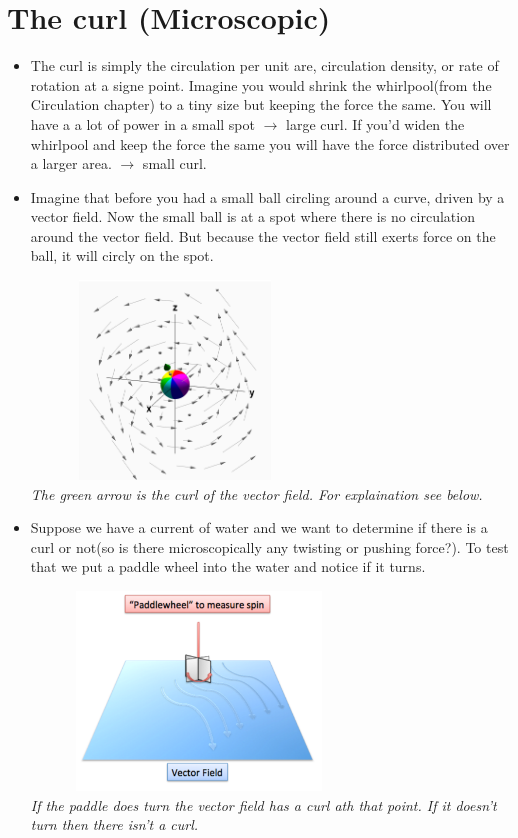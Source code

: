 \documentclass[12pt,a4paper]{article}
\begin{document}
	\section{The curl (Microscopic)}
	\begin{itemize}
		
		\item The curl is simply the circulation per unit are, circulation density, or rate of rotation at a signe point. Imagine you would shrink the whirlpool(from the Circulation chapter) to a tiny size but keeping the force the same. You will have a a lot of power in a small spot $\rightarrow$ large curl. If you'd widen the whirlpool and keep the force the same you will have the force distributed over a larger area. $\rightarrow$ small curl. 
		
		\item Imagine that before you had a small ball circling around a curve, driven by a vector field. Now the small ball is at a spot where there is no circulation around the vector field. But because the vector field still exerts force on the ball, it will circly on the spot. 
		
		\includegraphics[width=0.6\textwidth, height = 200px]{curl.png}\\
		\textit{The green arrow is the curl of the vector field. For explaination see below.}
		
		\item Suppose we have a current of water and we want to determine if there is a curl or not(so is there microscopically any twisting or pushing force?). To test that we put a paddle wheel into the water and notice if it turns. 
		
		\includegraphics[width=0.7\textwidth, height = 200px]{paddle_wheel.png}\\
		\textit{If the paddle does turn the vector field has a curl ath that point. If it doesn't turn then there isn't a curl.}
		

\end{itemize}
\end{document}
